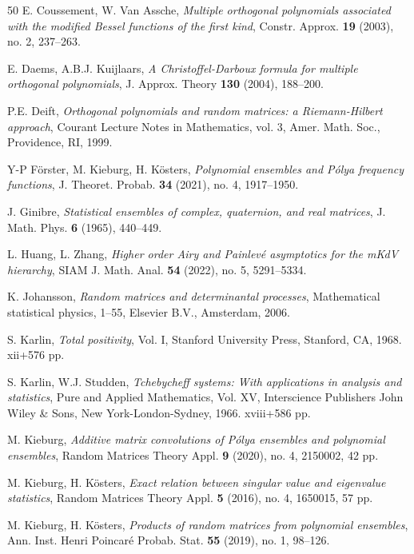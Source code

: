 \documentclass[a4paper,12pt,oneside]{article}
\theoremstyle{definition}
\begin{document}
\begin{thebibliography}{50}
E. Coussement, W. Van Assche,
\textit{Multiple orthogonal polynomials associated with the modified Bessel functions of the first kind}, 
Constr. Approx. \textbf{19} (2003), no. 2, 237--263.

E. Daems, A.B.J. Kuijlaars, 
\textit{A Christoffel-Darboux formula for multiple orthogonal polynomials}, 
J. Approx. Theory \textbf{130} (2004), 188–200.

P.E. Deift, 
\textit{Orthogonal polynomials and random matrices: a Riemann-Hilbert approach},
Courant Lecture Notes in Mathematics, vol. 3, Amer. Math. Soc., Providence, RI, 1999.

Y-P Förster, M. Kieburg, H. Kösters, 
\textit{Polynomial ensembles and Pólya frequency functions},
J. Theoret. Probab. \textbf{34} (2021), no. 4, 1917--1950.

J. Ginibre, 
\textit{Statistical ensembles of complex, quaternion, and real matrices}, 
J. Math. Phys. \textbf{6} (1965), 440–449.

L. Huang, L. Zhang, 
\textit{Higher order Airy and Painlevé asymptotics for the mKdV hierarchy},
SIAM J. Math. Anal. \textbf{54} (2022), no. 5, 5291--5334.

K. Johansson, 
\textit{Random matrices and determinantal processes},
Mathematical statistical physics, 1--55, Elsevier B.V., Amsterdam, 2006.

S. Karlin,
\textit{Total positivity},
Vol. I, Stanford University Press, Stanford, CA, 1968. {\rm xii}+576 pp.

S. Karlin, W.J. Studden,
\textit{Tchebycheff systems: With applications in analysis and statistics}, 
Pure and Applied Mathematics, Vol. XV, Interscience Publishers John Wiley \& Sons, New York-London-Sydney, 1966. {\rm xviii}+586 pp.

M. Kieburg, 
\textit{Additive matrix convolutions of Pólya ensembles and polynomial ensembles}, 
Random Matrices Theory Appl. \textbf{9} (2020), no. 4, 2150002, 42 pp.

M. Kieburg, H. Kösters,
\textit{Exact relation between singular value and eigenvalue statistics},
Random Matrices Theory Appl. \textbf{5} (2016), no. 4, 1650015, 57 pp.

M. Kieburg, H. Kösters, 
\textit{Products of random matrices from polynomial ensembles}, 
Ann. Inst. Henri Poincaré Probab. Stat. \textbf{55} (2019), no. 1, 98--126.


\end{thebibliography}
\end{document}
